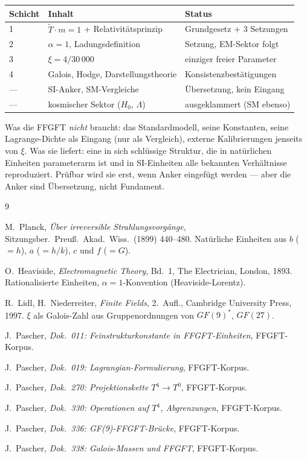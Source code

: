 \begin{center}
\begin{tabular}{@{}lll@{}}
\toprule
Schicht & Inhalt & Status \\
\midrule
1 & $\tilde{T}\cdot m=1$ + Relativitätsprinzip & Grundgesetz + 3 Setzungen \\
2 & $\alpha=1$, Ladungsdefinition & Setzung, EM-Sektor folgt \\
3 & $\xi=4/30\,000$ & einziger freier Parameter \\
4 & Galois, Hodge, Darstellungstheorie & Konsistenzbestätigungen \\
\midrule
— & SI-Anker, SM-Vergleiche & Übersetzung, kein Eingang \\
— & kosmischer Sektor ($H_0$, $\Lambda$) & ausgeklammert (SM ebenso) \\
\bottomrule
\end{tabular}
\end{center}

Was die FFGFT \emph{nicht} braucht: das Standardmodell, seine Konstanten, seine
Lagrange-Dichte als Eingang (nur als Vergleich), externe Kalibrierungen jenseits
von $\xi$. Was sie liefert: eine in sich schlüssige Struktur, die in natürlichen
Einheiten parameterarm ist und in SI-Einheiten alle bekannten Verhältnisse reproduziert.
Prüfbar wird sie erst, wenn Anker eingefügt werden --- aber die Anker sind
Übersetzung, nicht Fundament.

\begin{thebibliography}{9}

M.~Planck,
\textit{Über irreversible Strahlungsvorgänge},
Sitzungsber.\ Preuß.\ Akad.\ Wiss.\ (1899) 440--480.
Natürliche Einheiten aus $b$ ($=h$), $a$ ($=h/k$), $c$ und $f$ ($=G$).

O.~Heaviside,
\textit{Electromagnetic Theory}, Bd.~1,
The Electrician, London, 1893.
Rationalisierte Einheiten, $\alpha=1$-Konvention (Heaviside-Lorentz).

R.~Lidl, H.~Niederreiter,
\textit{Finite Fields},
2.~Aufl., Cambridge University Press, 1997.
$\xi$ als Galois-Zahl aus Gruppenordnungen von $GF(9)^*$, $GF(27)$.

J.~Pascher,
\textit{Dok.~011: Feinstrukturkonstante in FFGFT-Einheiten},
FFGFT-Korpus.

J.~Pascher,
\textit{Dok.~019: Lagrangian-Formulierung},
FFGFT-Korpus.

J.~Pascher,
\textit{Dok.~270: Projektionskette $T^4\to T^0$},
FFGFT-Korpus.

J.~Pascher,
\textit{Dok.~330: Operationen auf $T^4$, Abgrenzungen},
FFGFT-Korpus.

J.~Pascher,
\textit{Dok.~336: GF(9)-FFGFT-Brücke},
FFGFT-Korpus.

J.~Pascher,
\textit{Dok.~338: Galois-Massen und FFGFT},
FFGFT-Korpus.

\end{thebibliography}
